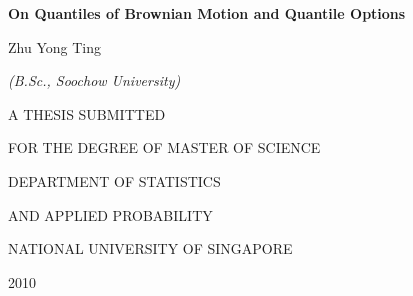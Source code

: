 \thispagestyle{empty}
\vspace{2cm}
\begin{center}\Large \bf
On Quantiles of Brownian Motion and Quantile Options

\vfill

Zhu Yong Ting

\textit{(B.Sc., Soochow University)}

\vfill

\normalsize
A THESIS SUBMITTED

\vspace{1em}

FOR THE DEGREE OF MASTER OF SCIENCE

\vspace{1em}

DEPARTMENT OF STATISTICS 

\vspace{1em}

AND APPLIED PROBABILITY

\vspace{1em}
\large
NATIONAL UNIVERSITY OF SINGAPORE

\vspace{1em}

2010

\end{center}

\vspace*{1cm}

\pagebreak